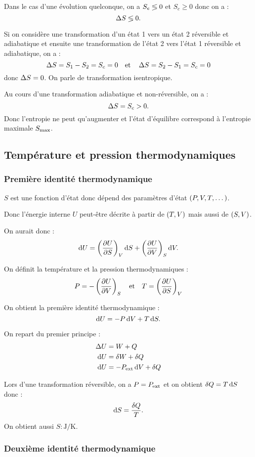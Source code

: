 Dans le cas d'une évolution quelconque, on a \(S_e\lessgtr0\) et \(S_c\geq0\) donc on a : \[\adif{S}\supinf0.\]

Si on considère une transformation d'un état 1 vers un état 2 réversible et adiabatique et ensuite une transformation de l'état 2 vers l'état 1 réversible et adiabatique, on a : \[\adif{S}=S_1-S_2=S_c=0\quad\text{et}\quad\adif{S}=S_2-S_1=S_c=0\] donc \(\adif{S}=0\). On parle de transformation isentropique.

Au cours d'une transformation adiabatique et non-réversible, on a : \[\adif{S}=S_c>0.\] Donc l'entropie ne peut qu'augmenter et l'état d'équilibre correspond à l'entropie maximale \(S_{\mathrm{max}}\).

\subsection{Température et pression thermodynamiques}

\subsubsection{Première identité thermodynamique}

\(S\) est une fonction d'état donc dépend des paramètres d'état \(\left(P,V,T,\dots\right)\).

Donc l'énergie interne \(U\) peut-être décrite à partir de \(\left(T,V\right)\) mais aussi de \(\left(S,V\right)\).

On aurait donc : \[\odif{U}=\pdv{U}{S}_V\odif{S}+\pdv{U}{V}_S\odif{V}.\]

On définit la température et la pression thermodynamiques : \[P=-\pdv{U}{V}_S\quad\text{et}\quad T=\pdv{U}{S}_V\]

On obtient la première identité thermodynamique : \[\odif{U}=-P\odif{V}+T\odif{S}.\]

On repart du premier principe : \[\begin{aligned}
\adif{U}&=W+Q \\
\odif{U}&=\fdif{W}+\fdif{Q} \\
\odif{U}&=-P_\ext\odif{V}+\fdif{Q}
\end{aligned}\]

Lors d'une transformation réversible, on a \(P=P_{\mathrm{ext}}\) et on obtient \(\fdif{Q}=T\odif{S}\) donc : \[\odif{S}=\dfrac{\fdif{Q}}{T}.\] On obtient aussi \(S:\unit{\joule\per\kelvin}\).

\subsubsection{Deuxième identité thermodynamique}

